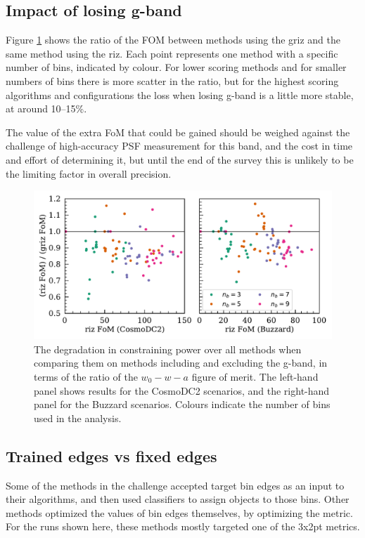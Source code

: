 \documentclass[twocolumn,twocolappendix]{aastex63}
\begin{document}
\subsection{Impact of losing g-band} \label{sec:gband}
Figure \ref{fig:loss} shows the ratio of the FOM between methods using the griz and the same method
using the riz.  Each point represents one method with a specific number of bins, indicated by colour.
For lower scoring methods and for smaller numbers of bins there is more scatter in the ratio,
but for the highest scoring algorithms and configurations the loss when losing g-band is a little
more stable, at around 10--15\%.

The value of the extra FoM that could be gained should be weighed against 
the challenge of high-accuracy
PSF measurement for this band, and the cost in time and effort of determining it, 
but until the end of the survey this is unlikely to be the limiting factor in overall precision.


\begin{figure}
\includegraphics[width=0.9\linewidth]{results/g_band_loss.pdf}
\caption{The degradation in constraining power over all methods
 when comparing them on methods including and excluding
the g-band, in terms of the ratio of the $w_0-w-a$ figure of merit.  The left-hand panel shows
results for the CosmoDC2 scenarios, and the right-hand panel for the Buzzard scenarios.  Colours
indicate the number of bins used in the analysis.}
\label{fig:loss}
\end{figure}

\subsection{Trained edges vs fixed edges}\label{sec:train-vs-fix}

Some of the methods in the challenge accepted target bin edges as an input to their algorithms,
and then used classifiers to assign objects to those bins.  Other methods optimized the values
of bin edges themselves, by optimizing the metric.  For the runs shown here, these methods mostly
targeted one of the 3x2pt metrics.
\end{document}
